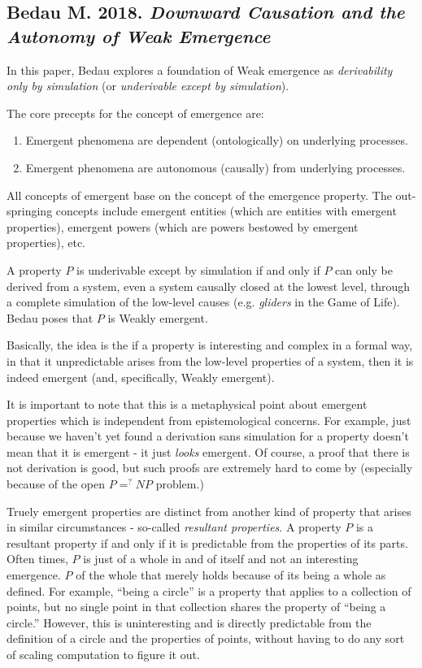\documentclass{article}
\newcommand{\ti}[1]{\textit{#1}}
\newcommand{\annbibtitle}[2]{\subsection*{#1. \ti{#2}}}
\begin{document}
\annbibtitle{Bedau M. 2018}{Downward Causation and the Autonomy of Weak Emergence}

In this paper, Bedau explores a foundation of Weak emergence as \ti{derivability only by simulation} (or \ti{underivable except by simulation}).

The core precepts for the concept of emergence are:
\begin{enumerate}
    \item Emergent phenomena are dependent (ontologically) on underlying processes.
    \item Emergent phenomena are autonomous (causally) from underlying processes.
\end{enumerate}

All concepts of emergent base on the concept of the emergence property. The out-springing concepts include emergent entities (which are entities with emergent properties), emergent powers (which are powers bestowed by emergent properties), etc.

A property $P$ is underivable except by simulation if and only if $P$ can only be derived from a system, even a system causally closed at the lowest level, through a complete simulation of the low-level causes (e.g. \ti{gliders} in the Game of Life). Bedau poses that $P$ is Weakly emergent.

Basically, the idea is the if a property is interesting and complex in a formal way, in that it unpredictable arises from the low-level properties of a system, then it is indeed emergent (and, specifically, Weakly emergent).

It is important to note that this is a metaphysical point about emergent properties which is independent from epistemological concerns. For example, just because we haven't yet found a derivation sans simulation for a property doesn't mean that it is emergent - it just \ti{looks} emergent. Of course, a proof that there is not derivation is good, but such proofs are extremely hard to come by (especially because of the open $P =^? NP$ problem.)

Truely emergent properties are distinct from another kind of property that arises in similar circumstances - so-called \ti{resultant properties}. A property $P$ is a resultant property if and only if it is predictable from the properties of its parts. Often times, $P$ is just of a whole in and of itself and not an interesting emergence. $P$ of the whole that merely holds because of its being a whole as defined. For example, ``being a circle'' is a property that applies to a collection of points, but no single point in that collection shares the property of ``being a circle.'' However, this is uninteresting and is directly predictable from the definition of a circle and the properties of points, without having to do any sort of scaling computation to figure it out.
\end{document}
